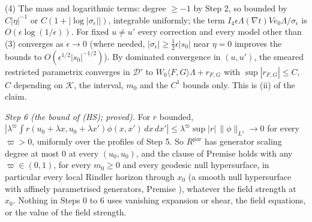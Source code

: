 (4) The mass and logarithmic terms: degree $\ge -1$ by Step 2, so bounded by $C|\eta|^{-1}$ or $C(1 + |\log|\sigma_{\epsilon}||)$, integrable uniformly; the term $I_{4}\epsilon\Lambda(\nabla t)Ve_{0}\Lambda/\sigma_{\epsilon}$ is $O(\epsilon\log(1/\epsilon))$.
For fixed $u \neq u'$ every correction and every model other than (3) converges as $\epsilon \to 0$ (where needed, $|\sigma_{\epsilon}| \ge \tfrac12\epsilon|s_{0}|$ near $\eta = 0$ improves the bounds to $O(\epsilon^{1/2}|s_{0}|^{-1/2})$). By dominated convergence in $(u, u')$, the smeared restricted parametrix converges in $\mathcal{D}'$ to $W_{0}\langle F, G\rangle\Lambda + r_{F,G}$ with $\sup|r_{F,G}| \le C$, $C$ depending on $\mathcal{K}$, the interval, $m_{0}$ and the $C^{1}$ bounds only. This is (ii) of the claim.

\emph{Step 6 (the bound of (HS); proved).} For $r$ bounded, $|\lambda^{\varpi}\int r(u_{0} + \lambda x, u_{0} + \lambda x')\phi(x, x')\,dx\,dx'| \le \lambda^{\varpi}\sup|r|\,\|\phi\|_{L^{1}} \to 0$ for every $\varpi > 0$, uniformly over the profiles of Step 5. So $R^{\mathrm{par}}$ has generator scaling degree at most $0$ at every $(u_{0}, u_{0})$, and the clause of Premise  holds with any $\varpi \in (0, 1)$, for every $m_{0} \ge 0$ and every geodesic null hypersurface, in particular every local Rindler horizon through $x_{0}$ (a smooth null hypersurface with affinely parametrised generators, Premise ), whatever the field strength at $x_{0}$. Nothing in Steps 0 to 6 uses vanishing expansion or shear, the field equations, or the value of the field strength.

